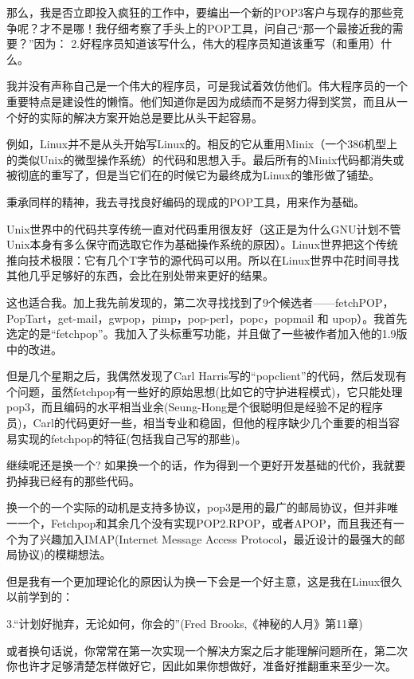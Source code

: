 \documentclass[a4paper,12pt,UTF8,twoside]{ctexbook}
\begin{document}
那么，我是否立即投入疯狂的工作中，要编出一个新的POP3客户与现存的那些竞争呢？才不是哪！我仔细考察了手头上的POP工具，问自己“那一个最接近我的需要？”因为：
2.好程序员知道该写什么，伟大的程序员知道该重写（和重用）什么。


我并没有声称自己是一个伟大的程序员，可是我试着效仿他们。伟大程序员的一个重要特点是建设性的懒惰。他们知道你是因为成绩而不是努力得到奖赏，而且从一个好的实际的解决方案开始总是要比从头干起容易。


例如，Linux并不是从头开始写Linux的。相反的它从重用Minix（一个386机型上的类似Unix的微型操作系统）的代码和思想入手。最后所有的Minix代码都消失或被彻底的重写了，但是当它们在的时候它为最终成为Linux的雏形做了铺垫。


秉承同样的精神，我去寻找良好编码的现成的POP工具，用来作为基础。


Unix世界中的代码共享传统一直对代码重用很友好（这正是为什么GNU计划不管Unix本身有多么保守而选取它作为基础操作系统的原因）。Linux世界把这个传统推向技术极限：它有几个T字节的源代码可以用。所以在Linux世界中花时间寻找其他几乎足够好的东西，会比在别处带来更好的结果。


这也适合我。加上我先前发现的，第二次寻找找到了9个候选者——fetchPOP，PopTart，get-mail，gwpop，pimp，pop-perl，popc，popmail 和 upop）。我首先选定的是“fetchpop”。我加入了头标重写功能，并且做了一些被作者加入他的1.9版中的改进。


但是几个星期之后，我偶然发现了Carl Harris写的“popclient”的代码，然后发现有个问题，虽然fetchpop有一些好的原始思想(比如它的守护进程模式)，它只能处理pop3，而且编码的水平相当业余(Seung-Hong是个很聪明但是经验不足的程序员)，Carl的代码更好一些，相当专业和稳固，但他的程序缺少几个重要的相当容易实现的fetchpop的特征(包括我自己写的那些)。


继续呢还是换一个? 如果换一个的话，作为得到一个更好开发基础的代价，我就要扔掉我已经有的那些代码。


换一个的一个实际的动机是支持多协议，pop3是用的最广的邮局协议，但并非唯一一个，Fetchpop和其余几个没有实现POP2.RPOP，或者APOP，而且我还有一个为了兴趣加入IMAP(Internet Message Access Protocol，最近设计的最强大的邮局协议)的模糊想法。


但是我有一个更加理论化的原因认为换一下会是一个好主意，这是我在Linux很久以前学到的：

3.“计划好抛弃，无论如何，你会的”(Fred Brooks,《神秘的人月》第11章)


或者换句话说，你常常在第一次实现一个解决方案之后才能理解问题所在，第二次你也许才足够清楚怎样做好它，因此如果你想做好，准备好推翻重来至少一次。
\end{document}
